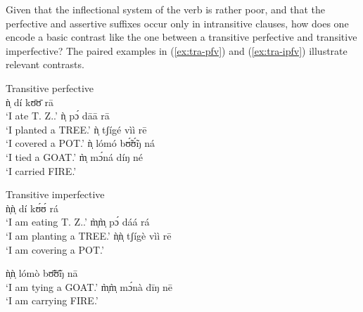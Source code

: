 \begin{exe}
\begin{exe}
\begin{exe}
{\begin{exe}
\begin{exe}
\begin{exe}
\begin{exe}
\begin{exe}
\begin{exe}
\begin{exe}
\begin{xlist}
\begin{exe}
\begin{exe}
\begin{exe}
\begin{exe}
\begin{exe}
\begin{exe}
\begin{exe}
\begin{exe}
\begin{exe}
\begin{exe}
\begin{exe}
\begin{exe}
\begin{exe}
\z 
 \z

Given that  the inflectional system of the verb is rather poor, and that the 
perfective
and assertive suffixes occur only in intransitive clauses,  how does one
encode a basic contrast like the one between a transitive perfective and
transitive imperfective? The paired examples in (\ref{ex:tra-pfv}) and
(\ref{ex:tra-ipfv})  illustrate 
 relevant contrasts. \nolinebreak 


\begin{multicols}{2}
\ea\label{ex:tra-pfv}{\rm Transitive perfective}\\

  \ea\label{ex:tra-pfv-eat}
ǹ̩ dí kʊ̄ʊ̄ rā\\
 `I ate T. Z..' 
 \ex\label{ex:tra-pfv-plant}
ǹ̩ pɔ́ dāā rā\\
`I planted a TREE.'
 \ex\label{ex:tra-pfv-cover}
ǹ̩ tʃígé vìì rē\\
`I covered a POT.' 
 \ex\label{ex:tra-pfv-tie}
ǹ̩ lómó bʊ̃́ʊ̃́ŋ ná\\
`I tied a GOAT.' 
 \ex\label{ex:tra-pfv-carry}
m̩̀ mɔ́ná díŋ né\\
`I carried  FIRE.' 

\z 
 \z

\ea\label{ex:tra-ipfv}{\rm Transitive imperfective}\\

 \ea\label{ex:tra-ipfv-eat}
ǹ̩ǹ̩ dí kʊ́ʊ́ rá\\
`I am eating T. Z..' 
 \ex\label{ex:tra-ipfv-plant}
m̩̀m̩̀ pɔ́ dáá rá\\
`I am planting a TREE.' 
 \ex\label{ex:tra-ipfv-cover}
ǹ̩ǹ̩ tʃígè vìì rē\\
`I am covering  a POT.' 

 \ex\label{ex:tra-ipfv-tie}
ǹ̩ǹ̩ lómò bʊ̃̄ʊ̃̄ŋ nā\\
`I am tying  a GOAT.' 
 \ex\label{ex:tra-ipfv-carry}
m̩̀m̩̀ mɔ́nà dīŋ nē\\
`I am carrying  FIRE.' 

\z 
 \z
 
\end{multicols}



\end{exe}
\end{exe}
\end{exe}
\end{exe}
\end{exe}
\end{exe}
\end{exe}
\end{exe}
\end{exe}
\end{exe}
\end{exe}
\end{exe}
\end{exe}
\end{xlist}
\end{exe}
\end{exe}
\end{exe}
\end{exe}
\end{exe}
\end{exe}
\end{exe}}
\end{exe}
\end{exe}
\end{exe}
